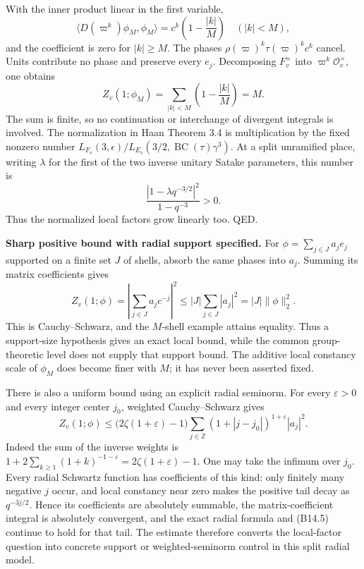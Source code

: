 \documentclass[11pt,a4paper]{article}
\theoremstyle{definition}
\begin{document}
With the inner product linear in the first variable, \[
 \langle D(\varpi^k)\phi_M,\phi_M\rangle
 =c^k\left(1-\frac{|k|}{M}\right)
 \quad (|k|<M),
\] and the coefficient is zero for \(|k|\ge M\). The phases \(\rho(\varpi)^k\tau(\varpi)^kc^k\) cancel. Units contribute no phase and preserve every \(e_j\). Decomposing \(F_v^\times\) into \(\varpi^k\mathcal O_v^\times\), one obtains \[
 Z_v(1;\phi_M)=\sum_{|k|<M}\left(1-\frac{|k|}{M}\right)=M.
\] The sum is finite, so no continuation or interchange of divergent integrals is involved. The normalization in Haan Theorem 3.4 is multiplication by the fixed nonzero number \(L_{F_v}(3,\epsilon)/L_{E_v}(3/2,\operatorname{BC}(\tau)\gamma^3)\). At a split unramified place, writing \(\lambda\) for the first of the two inverse unitary Satake parameters, this number is \[
 \frac{|1-\lambda q^{-3/2}|^2}{1-q^{-3}}>0.
\] Thus the normalized local factors grow linearly too. QED.

\textbf{Sharp positive bound with radial support specified.} For \(\phi=\sum_{j\in J}a_j e_j\) supported on a finite set \(J\) of shells, absorb the same phases into \(a_j\). Summing its matrix coefficients gives \[
 Z_v(1;\phi)=\left|\sum_{j\in J}a_jc^{-j}\right|^2
 \le |J|\sum_{j\in J}|a_j|^2
 =|J|\|\phi\|_2^2.
\tag{B14.3}
\] This is Cauchy--Schwarz, and the \(M\)-shell example attains equality. Thus a support-size hypothesis gives an exact local bound, while the common group-theoretic level does not supply that support bound. The additive local constancy scale of \(\phi_M\) does become finer with \(M\); it has never been asserted fixed.

There is also a uniform bound using an explicit radial seminorm. For every \(\varepsilon>0\) and every integer center \(j_0\), weighted Cauchy--Schwarz gives \[
 Z_v(1;\phi)\le
 \bigl(2\zeta(1+\varepsilon)-1\bigr)
 \sum_{j\in\mathbb Z}(1+|j-j_0|)^{1+\varepsilon}|a_j|^2.
\tag{B14.5}
\] Indeed the sum of the inverse weights is \(1+2\sum_{k\ge1}(1+k)^{-1-\varepsilon}=2\zeta(1+\varepsilon)-1\). One may take the infimum over \(j_0\). Every radial Schwartz function has coefficients of this kind: only finitely many negative \(j\) occur, and local constancy near zero makes the positive tail decay as \(q^{-3j/2}\). Hence its coefficients are absolutely summable, the matrix-coefficient integral is absolutely convergent, and the exact radial formula and (B14.5) continue to hold for that tail. The estimate therefore converts the local-factor question into concrete support or weighted-seminorm control in this split radial model.
\end{document}
